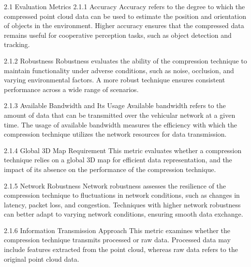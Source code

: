 \documentclass[conference]{IEEEtran}
\begin{document}
2.1 Evaluation Metrics
2.1.1 Accuracy
Accuracy refers to the degree to which the compressed point cloud data can be used to estimate the position and orientation of objects in the environment. Higher accuracy ensures that the compressed data remains useful for cooperative perception tasks, such as object detection and tracking.

2.1.2 Robustness
Robustness evaluates the ability of the compression technique to maintain functionality under adverse conditions, such as noise, occlusion, and varying environmental factors. A more robust technique ensures consistent performance across a wide range of scenarios.

2.1.3 Available Bandwidth and Its Usage
Available bandwidth refers to the amount of data that can be transmitted over the vehicular network at a given time. The usage of available bandwidth measures the efficiency with which the compression technique utilizes the network resources for data transmission.

2.1.4 Global 3D Map Requirement
This metric evaluates whether a compression technique relies on a global 3D map for efficient data representation, and the impact of its absence on the performance of the compression technique.

2.1.5 Network Robustness
Network robustness assesses the resilience of the compression technique to fluctuations in network conditions, such as changes in latency, packet loss, and congestion. Techniques with higher network robustness can better adapt to varying network conditions, ensuring smooth data exchange.

2.1.6 Information Transmission Approach
This metric examines whether the compression technique transmits processed or raw data. Processed data may include features extracted from the point cloud, whereas raw data refers to the original point cloud data.
\end{document}
